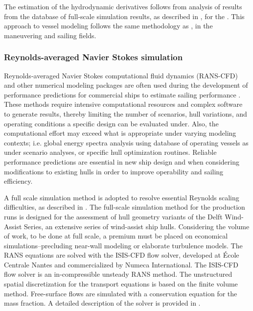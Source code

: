 \documentclass[twoside,twocolumn]{article}
\begin{document}
The estimation of the hydrodynamic derivatives follows from analysis of results from the database of full-scale simulation results, as described in \cite{Kolk18c,Kolk19d}, for the \DWA. This approach to vessel modeling follows the same methodology as \citet{Tsakonas1959,Jacobs1966,Inoue1981,Keuning1998,Tox11}, in the maneuvering and sailing fields.

\subsubsection{Reynolds-averaged Navier Stokes simulation}

Reynolds-averaged Navier Stokes computational fluid dynamics (RANS-CFD) and other numerical modeling packages are often used during the development of performance predictions for commercial ships to estimate sailing performance \citep{Tezdogan2015,Eggers16,Kolk18c}. These methods require intensive computational resources and complex software to generate results, thereby limiting the number of scenarios, hull variations, and operating conditions a specific design can be evaluated under. Also, the computational effort may exceed what is appropriate under varying modeling contexts; i.e. global energy spectra analysis using database of operating vessels as under scenario analyses, or specific hull optimization routines. Reliable performance predictions are essential in new ship design and when considering modifications to existing hulls in order to improve operability and sailing efficiency. 

A full scale simulation method is adopted to resolve essential Reynolds scaling difficulties, as described in \cite{Kolk19d}. The full-scale simulation method for the production runs is designed for the assessment of hull geometry variants of the Delft Wind-Assist Series, an extensive series of wind-assist ship hulls. Considering the volume of work, to be done at full scale, a premium must be placed on economical simulations--precluding near-wall modeling or elaborate turbulence models. The RANS equations are solved with the ISIS-CFD flow solver, developed at \'{E}cole Centrale Nantes and commercialized by Numeca International. The ISIS-CFD flow solver is an in-compressible unsteady RANS method. The unstructured spatial discretization for the transport equations is based on the finite volume method. Free-surface flows are simulated with a conservation equation for the mass fraction. A detailed description of the solver is provided in \cite{Den05,Den06,Que07,Duv03}.
\end{document}
